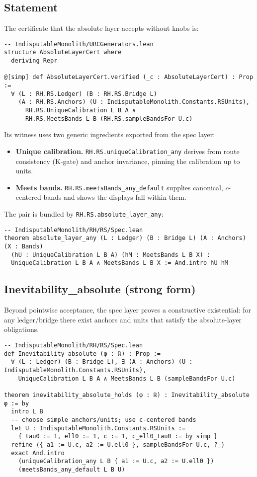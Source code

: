 \documentclass[11pt,a4paper,twoside]{article}
\numberwithin{equation}{section}
\theoremstyle{customthm}
\theoremstyle{customdef}
\theoremstyle{customrem}
\begin{document}
\subsection{Statement}

\noindent The certificate that the absolute layer accepts without knobs is:

\begin{lstlisting}
-- IndisputableMonolith/URCGenerators.lean
structure AbsoluteLayerCert where
  deriving Repr

@[simp] def AbsoluteLayerCert.verified (_c : AbsoluteLayerCert) : Prop :=
  ∀ (L : RH.RS.Ledger) (B : RH.RS.Bridge L)
    (A : RH.RS.Anchors) (U : IndisputableMonolith.Constants.RSUnits),
      RH.RS.UniqueCalibration L B A ∧
      RH.RS.MeetsBands L B (RH.RS.sampleBandsFor U.c)
\end{lstlisting}

\noindent Its witness uses two generic ingredients exported from the spec layer:
\begin{itemize}[leftmargin=*]
  \item \textbf{Unique calibration.} \texttt{RH.RS.uniqueCalibration\_any} derives from route consistency (K‑gate) and anchor invariance, pinning the calibration up to units.
  \item \textbf{Meets bands.} \texttt{RH.RS.meetsBands\_any\_default} supplies canonical, \(c\)-centered bands and shows the displays fall within them.
\end{itemize}

\noindent The pair is bundled by \texttt{RH.RS.absolute\_layer\_any}:
\begin{lstlisting}
-- IndisputableMonolith/RH/RS/Spec.lean
theorem absolute_layer_any (L : Ledger) (B : Bridge L) (A : Anchors) (X : Bands)
  (hU : UniqueCalibration L B A) (hM : MeetsBands L B X) :
  UniqueCalibration L B A ∧ MeetsBands L B X := And.intro hU hM
\end{lstlisting}

\subsection{Inevitability\_absolute (strong form)}

\noindent Beyond pointwise acceptance, the spec layer proves a constructive existential: for any ledger/bridge there exist anchors and units that satisfy the absolute-layer obligations.

\begin{lstlisting}
-- IndisputableMonolith/RH/RS/Spec.lean
def Inevitability_absolute (φ : ℝ) : Prop :=
  ∀ (L : Ledger) (B : Bridge L), ∃ (A : Anchors) (U : IndisputableMonolith.Constants.RSUnits),
    UniqueCalibration L B A ∧ MeetsBands L B (sampleBandsFor U.c)

theorem inevitability_absolute_holds (φ : ℝ) : Inevitability_absolute φ := by
  intro L B
  -- choose simple anchors/units; use c-centered bands
  let U : IndisputableMonolith.Constants.RSUnits :=
    { tau0 := 1, ell0 := 1, c := 1, c_ell0_tau0 := by simp }
  refine ⟨{ a1 := U.c, a2 := U.ell0 }, sampleBandsFor U.c, ?_⟩
  exact And.intro
    (uniqueCalibration_any L B { a1 := U.c, a2 := U.ell0 })
    (meetsBands_any_default L B U)
\end{lstlisting}
\end{document}
